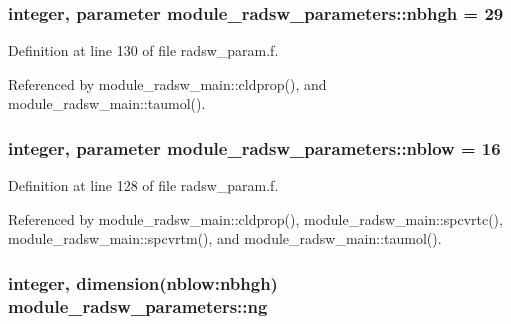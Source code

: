 \subsubsection[{\texorpdfstring{nbhgh}{nbhgh}}]{\setlength{\rightskip}{0pt plus 5cm}integer, parameter module\+\_\+radsw\+\_\+parameters\+::nbhgh = 29}\hypertarget{namespacemodule__radsw__parameters_a39e5ca4fd5defbc2545ee39bbf50d61b}{}\label{namespacemodule__radsw__parameters_a39e5ca4fd5defbc2545ee39bbf50d61b}


Definition at line 130 of file radsw\+\_\+param.\+f.



Referenced by module\+\_\+radsw\+\_\+main\+::cldprop(), and module\+\_\+radsw\+\_\+main\+::taumol().

\subsubsection[{\texorpdfstring{nblow}{nblow}}]{\setlength{\rightskip}{0pt plus 5cm}integer, parameter module\+\_\+radsw\+\_\+parameters\+::nblow = 16}\hypertarget{namespacemodule__radsw__parameters_a2c5efc91f02dc0d4bdbd5e490f44c19c}{}\label{namespacemodule__radsw__parameters_a2c5efc91f02dc0d4bdbd5e490f44c19c}


Definition at line 128 of file radsw\+\_\+param.\+f.



Referenced by module\+\_\+radsw\+\_\+main\+::cldprop(), module\+\_\+radsw\+\_\+main\+::spcvrtc(), module\+\_\+radsw\+\_\+main\+::spcvrtm(), and module\+\_\+radsw\+\_\+main\+::taumol().

\subsubsection[{\texorpdfstring{ng}{ng}}]{\setlength{\rightskip}{0pt plus 5cm}integer, dimension(nblow\+:nbhgh) module\+\_\+radsw\+\_\+parameters\+::ng}\hypertarget{namespacemodule__radsw__parameters_aff9670cd3f5bef92ca998e491e28986e}{}\label{namespacemodule__radsw__parameters_aff9670cd3f5bef92ca998e491e28986e}


